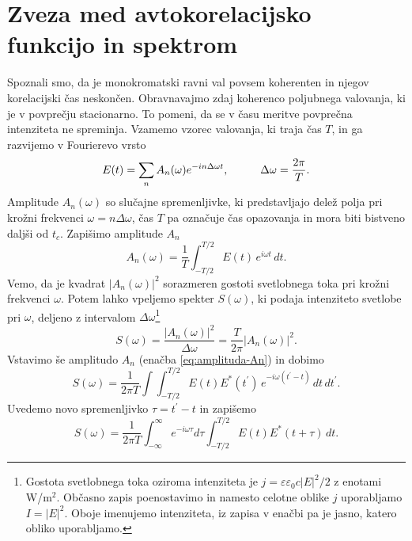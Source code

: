 \section{Zveza med avtokorelacijsko funkcijo in spektrom}

Spoznali smo, da je monokromatski ravni val povsem koherenten in njegov
korelacijski čas neskončen. Obravnavajmo zdaj koherenco poljubnega valovanja, ki
je v povprečju stacionarno. To pomeni, da se v času meritve povprečna intenziteta
ne spreminja. Vzamemo vzorec valovanja, ki traja čas $T$, in ga razvijemo 
v Fourierevo vrsto
\begin{equation}
E(t)=\sum_{n}A_{n}(\omega)e^{-in\Delta\omega t},\mbox{\hskip1cm}\Delta\omega=\frac{2\pi}{T}.
\end{equation}
Amplitude $A_{n}(\omega)$ so slučajne spremenljivke, ki predstavljajo delež polja pri 
krožni frekvenci $\omega=n\Delta\omega$, 
čas $T$ pa označuje čas opazovanja in mora biti bistveno daljši od $t_{c}$. 
Zapišimo amplitude $A_n$
\begin{equation}
A_{n}(\omega)=\frac{1}{T}\int_{-T/2}^{T/2}E(t)\, e^{i\omega t}\, dt.\label{eq:amplituda-An}
\end{equation}
 Vemo, da je kvadrat $|A_{n}(\omega)|^{2}$ sorazmeren gostoti 
svetlobnega toka pri krožni frekvenci $\omega$. Potem lahko vpeljemo 
spekter $S(\omega)$, ki podaja intenziteto svetlobe pri $\omega$,
deljeno z intervalom $\Delta\omega$\footnote{Gostota 
svetlobnega toka oziroma intenziteta
je $j = \varepsilon \varepsilon_0 c |E|^2/2$
z enotami W/m$^2$. Občasno zapis poenostavimo in namesto celotne 
oblike $j$ uporabljamo $I = |E|^2$. Oboje imenujemo intenziteta, iz zapisa
v enačbi pa je jasno, katero obliko uporabljamo. 
} 
\begin{equation}
S(\omega)=\frac{|A_{n}(\omega)|^{2}}{\Delta\omega}=\frac{T}{2\pi}|A_{n}(\omega)|^{2}.
\end{equation}
Vstavimo še amplitudo $A_{n}$ (enačba \ref{eq:amplituda-An}) in dobimo 
\begin{equation}
S(\omega) =\frac{1}{2\pi T}\int\int_{-T/2}^{T/2}E(t)E^{*}(t^{\prime})\, 
e^{-i\omega(t^{\prime}-t)}\, dt\, dt^{\prime}.
\end{equation}
Uvedemo novo spremenljivko $\tau=t^{\prime}-t$ in zapišemo
\begin{equation}
S(\omega)=\frac{1}{2\pi T}\int_{-\infty}^{\infty}e^{-i\omega\tau}d\tau\int_{-T/2}^{T/2}E(t)E^{*}(t+\tau)\, dt.
\label{eq:spekter}
\end{equation}
